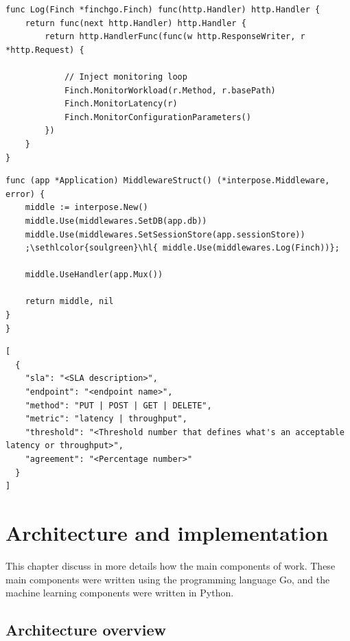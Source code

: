 \begin{lstlisting}[float,floatplacement=H,escapechar=;,caption={Defining logging middleware for Finch's logging},label={lst:finchlog}]
func Log(Finch *finchgo.Finch) func(http.Handler) http.Handler {
	return func(next http.Handler) http.Handler {
		return http.HandlerFunc(func(w http.ResponseWriter, r *http.Request) {

			// Inject monitoring loop
			Finch.MonitorWorkload(r.Method, r.basePath)
			Finch.MonitorLatency(r)
			Finch.MonitorConfigurationParameters()
		})
	}
}
\end{lstlisting}

\begin{lstlisting}[float,floatplacement=H,escapechar=;,caption={Injecting Finch's logging middleware into target system's HTTP middleware},label={lst:middleware}]
func (app *Application) MiddlewareStruct() (*interpose.Middleware, error) {
	middle := interpose.New()
	middle.Use(middlewares.SetDB(app.db))
	middle.Use(middlewares.SetSessionStore(app.sessionStore))
	;\sethlcolor{soulgreen}\hl{	middle.Use(middlewares.Log(Finch))};

	middle.UseHandler(app.Mux())

	return middle, nil
}
}
\end{lstlisting}

\begin{lstlisting}[float,floatplacement=H,caption={finch\_sla.json describe each SLA in the target system},label={lst:finchsla}]
[
  {
    "sla": "<SLA description>",
    "endpoint": "<endpoint name>",
    "method": "PUT | POST | GET | DELETE",
    "metric": "latency | throughput",
    "threshold": "<Threshold number that defines what's an acceptable latency or throughput>",
    "agreement": "<Percentage number>"
  }
]
\end{lstlisting}

\section{Architecture and implementation}

This chapter discuss in more details how the main components of \projectname{} work. These main components were written using the programming language Go, and the machine learning components were written in Python.

\subsection{Architecture overview}

